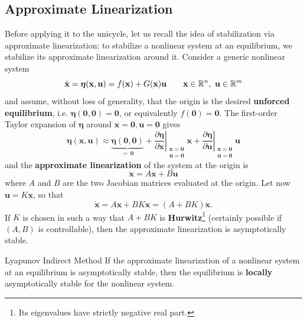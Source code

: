 \documentclass[10pt, a4paper]{report}
\begin{document}
\subsection{Approximate Linearization}
Before applying it to the unicycle, let us recall the idea of stabilization via approximate linearization: to stabilize a nonlinear system at an equilibrium, we stabilize its approximate linearization around it. Consider a generic nonlinear system\begin{equation}
    \dot{\mathbf x}=\boldsymbol\eta(\mathbf x,\mathbf u)=f(\mathbf x)+G(\mathbf x)\mathbf u\qquad \mathbf x\in{\mathbb R}^n,\ \mathbf u\in{\mathbb R}^m
\end{equation}
and assume, without loss of generality, that the origin is the desired \textbf{unforced equilibrium}, i.e. $\boldsymbol\eta(\mathbf 0,\mathbf 0)=\mathbf 0$, or equivalently $f(\mathbf 0)=\mathbf 0$. The first-order Taylor expansion of $\boldsymbol\eta$ around $\mathbf x=\mathbf 0,\mathbf u=\mathbf 0$ gives\begin{equation}
    \boldsymbol\eta(\mathbf x,\mathbf u)\approx\underbrace{\boldsymbol\eta(\mathbf 0,\mathbf 0)}_{=\,\mathbf 0}+\left.\frac{\partial\boldsymbol\eta}{\partial\mathbf x}\right|_{\substack{\mathbf x=\mathbf 0\\\mathbf u=\mathbf 0}}\mathbf x+\left.\frac{\partial\boldsymbol\eta}{\partial\mathbf u}\right|_{\substack{\mathbf x=\mathbf 0\\\mathbf u=\mathbf 0}}\mathbf u
\end{equation}
and the \textbf{approximate linearization} of the system at the origin is\begin{equation}
    \dot{\mathbf x}=A\mathbf x+B\mathbf u
\end{equation}
where $A$ and $B$ are the two Jacobian matrices evaluated at the origin. Let now $\mathbf u=K\mathbf x$, so that\begin{equation}
    \dot{\mathbf x}=A\mathbf x+BK\mathbf x=(A+BK)\mathbf x.
\end{equation}
If $K$ is chosen in such a way that $A+BK$ is \textbf{Hurwitz}\footnote{Its eigenvalues have strictly negative real part.} (certainly possible if $(A,B)$ is controllable), then the approximate linearization is asymptotically stable.
\begin{boxtheorem}{Lyapunov Indirect Method}{}
    If the approximate linearization of a nonlinear system at an equilibrium is asymptotically stable, then the equilibrium is \textbf{locally} asymptotically stable for the nonlinear system.
\end{boxtheorem}
\end{document}
